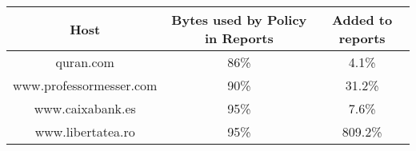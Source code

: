 \begin{table}
\begin{center}
\begin{tabular}{| c c c |}
	\hline
	Host & Bytes used by Policy in Reports & Added to reports \\ \hline
	quran.com               & 86\% &   4.1\% & \\ \hline 
	www.professormesser.com & 90\% &  31.2\% & \\ \hline 
	www.caixabank.es        & 95\% &   7.6\% & \\ \hline 
	www.libertatea.ro       & 95\% & 809.2\% & \\ \hline 
\end{tabular}
\end{center}
\label{tab:optimistic}
\end{table}





